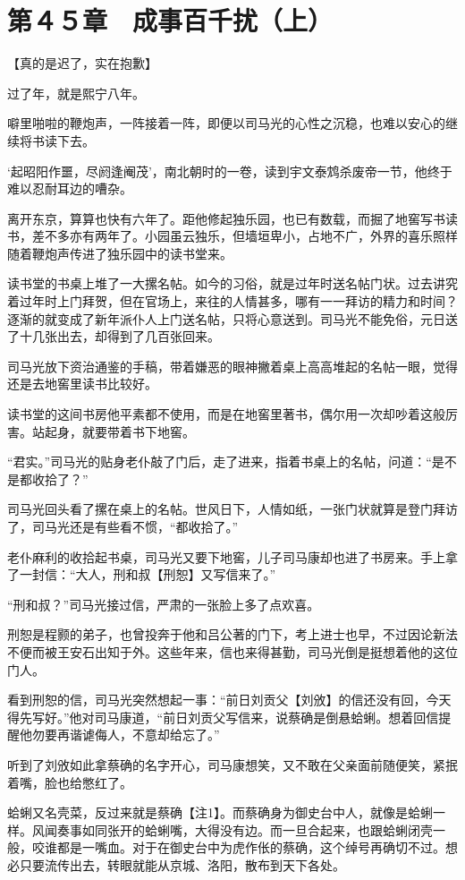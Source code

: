 \section{第４５章　成事百千扰（上）}

【真的是迟了，实在抱歉】

过了年，就是熙宁八年。

噼里啪啦的鞭炮声，一阵接着一阵，即便以司马光的心性之沉稳，也难以安心的继续将书读下去。

‘起昭阳作噩，尽阏逢阉茂’，南北朝时的一卷，读到宇文泰鸩杀废帝一节，他终于难以忍耐耳边的嘈杂。

离开东京，算算也快有六年了。距他修起独乐园，也已有数载，而掘了地窖写书读书，差不多亦有两年了。小园虽云独乐，但墙垣卑小，占地不广，外界的喜乐照样随着鞭炮声传进了独乐园中的读书堂来。

读书堂的书桌上堆了一大摞名帖。如今的习俗，就是过年时送名帖门状。过去讲究着过年时上门拜贺，但在官场上，来往的人情甚多，哪有一一拜访的精力和时间？逐渐的就变成了新年派仆人上门送名帖，只将心意送到。司马光不能免俗，元日送了十几张出去，却得到了几百张回来。

司马光放下资治通鉴的手稿，带着嫌恶的眼神撇着桌上高高堆起的名帖一眼，觉得还是去地窖里读书比较好。

读书堂的这间书房他平素都不使用，而是在地窖里著书，偶尔用一次却吵着这般厉害。站起身，就要带着书下地窖。

“君实。”司马光的贴身老仆敲了门后，走了进来，指着书桌上的名帖，问道：“是不是都收拾了？”

司马光回头看了摞在桌上的名帖。世风日下，人情如纸，一张门状就算是登门拜访了，司马光还是有些看不惯，“都收拾了。”

老仆麻利的收拾起书桌，司马光又要下地窖，儿子司马康却也进了书房来。手上拿了一封信：“大人，刑和叔【刑恕】又写信来了。”

“刑和叔？”司马光接过信，严肃的一张脸上多了点欢喜。

刑恕是程颢的弟子，也曾投奔于他和吕公著的门下，考上进士也早，不过因论新法不便而被王安石出知于外。这些年来，信也来得甚勤，司马光倒是挺想着他的这位门人。

看到刑恕的信，司马光突然想起一事：“前日刘贡父【刘攽】的信还没有回，今天得先写好。”他对司马康道，“前日刘贡父写信来，说蔡确是倒悬蛤蜊。想着回信提醒他勿要再谐谑侮人，不意却给忘了。”

听到了刘攽如此拿蔡确的名字开心，司马康想笑，又不敢在父亲面前随便笑，紧抿着嘴，脸也给憋红了。

蛤蜊又名壳菜，反过来就是蔡确【注1】。而蔡确身为御史台中人，就像是蛤蜊一样。风闻奏事如同张开的蛤蜊嘴，大得没有边。而一旦合起来，也跟蛤蜊闭壳一般，咬谁都是一嘴血。对于在御史台中为虎作伥的蔡确，这个绰号再确切不过。想必只要流传出去，转眼就能从京城、洛阳，散布到天下各处。

